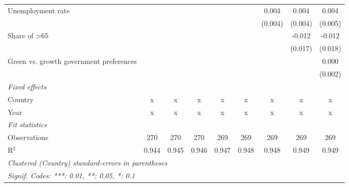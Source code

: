 \begin{table}[htbp]
\begin{tabular}{lcccccccc}
      Unemployment rate                            &         &             &         &         &             & 0.004        & 0.004        & 0.004\\   
                                                   &         &             &         &         &             & (0.004)      & (0.004)      & (0.005)\\   
      Share of >65                                 &         &             &         &         &             &              & -0.012       & -0.012\\   
                                                   &         &             &         &         &             &              & (0.017)      & (0.018)\\   
      Green vs. growth government preferences      &         &             &         &         &             &              &              & 0.000\\   
                                                   &         &             &         &         &             &              &              & (0.002)\\   
      \emph{Fixed effects}\\
      Country                                      & x       & x           & x       & x       & x           & x            & x            & x\\  
      Year                                         & x       & x           & x       & x       & x           & x            & x            & x\\  
      \midrule \emph{Fit statistics}\\
      Observations                                 & 270     & 270         & 270     & 269     & 269         & 269          & 269          & 269\\  
      R$^2$                                        & 0.944   & 0.945       & 0.946   & 0.947   & 0.948       & 0.948        & 0.949        & 0.949\\  
      \midrule
      \multicolumn{9}{l}{\emph{Clustered (Country) standard-errors in parentheses}}\\
      \multicolumn{9}{l}{\emph{Signif. Codes: ***: 0.01, **: 0.05, *: 0.1}}\\
   \end{tabular}
\end{table}



